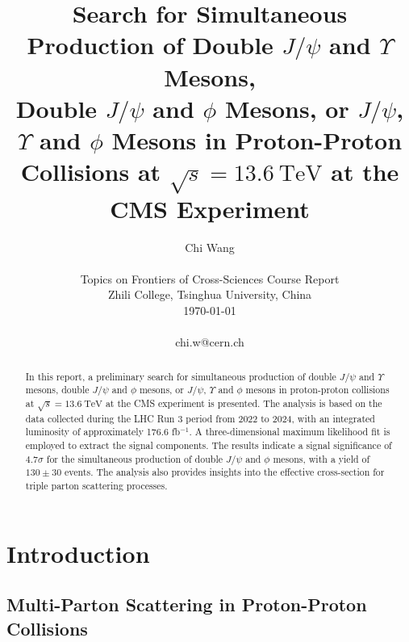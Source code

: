 \documentclass[10pt,twocolumn]{article}
\begin{document}
\title{Search for Simultaneous Production of Double $J/\psi$ and $\Upsilon$ Mesons,\\Double $J/\psi$ and $\phi$ Mesons, or $J/\psi$, $\Upsilon$ and $\phi$ Mesons in Proton-Proton\\ Collisions at $\sqrt{s} = 13.6 ~ \mathrm{TeV}$ at the CMS Experiment}

\author{Chi Wang \\
\\
Topics on Frontiers of Cross-Sciences Course Report \\
Zhili College, Tsinghua University, China \\
\today
\\
\\
chi.w@cern.ch  \\
}

\maketitle
\thispagestyle{empty}

\begin{abstract}
In this report, a preliminary search for simultaneous production of double $J/\psi$ and $\Upsilon$ mesons, double $J/\psi$ and $\phi$ mesons, or $J/\psi$, $\Upsilon$ and $\phi$ mesons in proton-proton collisions at $\sqrt{s} = 13.6 ~ \mathrm{TeV}$ at the CMS experiment is presented. The analysis is based on the data collected during the LHC Run 3 period from 2022 to 2024, with an integrated luminosity of approximately 176.6 fb$^{-1}$. A three-dimensional maximum likelihood fit is employed to extract the signal components. The results indicate a signal significance of $4.7 \sigma$ for the simultaneous production of double $J/\psi$ and $\phi$ mesons, with a yield of $130 \pm 30$ events. The analysis also provides insights into the effective cross-section for triple parton scattering processes.
\end{abstract}


\section{Introduction}

\subsection{Multi-Parton Scattering in Proton-Proton Collisions}
\end{document}
